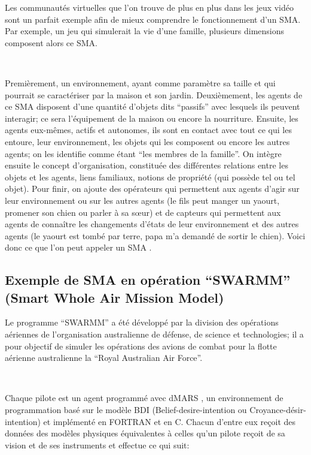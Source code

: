 Les communautés virtuelles que l’on trouve de plus en plus dans les jeux vidéo sont un parfait exemple afin de mieux comprendre le fonctionnement d’un SMA. Par exemple, un jeu qui simulerait la vie d’une famille, plusieurs dimensions composent alors ce SMA.

~\par
Premièrement, un environnement, ayant comme paramètre sa taille et qui pourrait se caractériser par la maison et son jardin. Deuxièmement, les agents de ce SMA disposent d’une quantité d’objets dits “passifs” avec lesquels ils peuvent interagir; ce sera l’équipement de la maison ou encore la nourriture. Ensuite, les agents eux-mêmes, actifs et autonomes, ils sont en contact avec tout ce qui les entoure, leur environnement, les objets qui les composent ou encore les autres agents; on les identifie comme étant “les membres de la famille”. On intègre ensuite le concept d’organisation, constituée des différentes relations entre les objets et les agents, liens familiaux, notions de propriété (qui possède tel ou tel objet). Pour finir, on ajoute des opérateurs qui permettent aux agents d’agir sur leur environnement ou sur les autres agents (le fils peut manger un yaourt, promener son chien ou parler à sa sœur) et de capteurs qui permettent aux agents de connaître les changements d'états de leur environnement et des autres agents (le yaourt est tombé par terre, papa m'a demandé de sortir le chien). Voici donc ce que l'on peut appeler un SMA \parencite{sma}.


\subsection{Exemple de SMA en opération “SWARMM” (Smart Whole Air Mission Model)} \label{ssec:swarm}

Le  programme “SWARMM” \parencite{jones1999automated} a été développé par la division des opérations aériennes de l’organisation australienne de défense, de science et technologies; il a  pour objectif de simuler les opérations des avions de combat pour la flotte aérienne australienne la “Royal Australian Air Force”.

~\par
Chaque pilote est un agent programmé avec dMARS \parencite{dmars1997formal}, un environnement de programmation basé sur le modèle BDI (Belief-desire-intention ou Croyance-désir-intention) et implémenté en FORTRAN et en C. Chacun d'entre eux reçoit des données des modèles physiques équivalentes à celles qu'un pilote reçoit de sa vision et de ses instruments et effectue ce qui suit:


